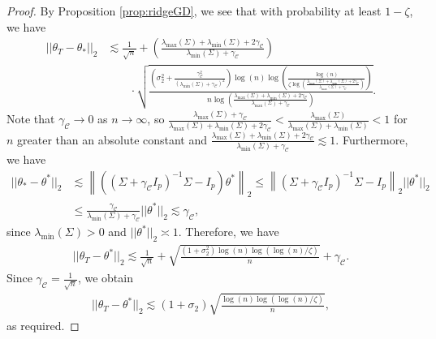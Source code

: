 \documentclass{article}
\begin{document}
\begin{proof}
By Proposition \ref{prop:ridgeGD}, we see that with probability at least $1 - \zeta$, we have
\begin{align*}
||\theta_T - \theta_{*}||_2 &\lesssim \frac{1}{\sqrt{n}} + \left(\frac{\lambda_{\max}(\Sigma) + \lambda_{\min}(\Sigma) + 2\gamma_{\mathcal{C}}}{\lambda_{\min}(\Sigma) + \gamma_{\mathcal{C}}}\right)\\
& \qquad \cdot \sqrt{\frac{\left(\sigma_2^2 + \frac{\gamma_{\mathcal{C}}^2}{(\lambda_{\min}(\Sigma) + \gamma_{\mathcal{C}})^2}\right)\log(n)\log\left(\frac{\log(n)}{\zeta\log\left(\frac{\lambda_{\max}(\Sigma) + \lambda_{\min}(\Sigma) + 2\gamma_{\mathcal{C}}}{\lambda_{\max}(\Sigma) + \gamma_{\mathcal{C}}}\right)}\right)}{n\log\left(\frac{\lambda_{\max}(\Sigma) + \lambda_{\min}(\Sigma) + 2\gamma_{\mathcal{C}}}{\lambda_{\max}(\Sigma) + \gamma_{\mathcal{C}}}\right)}}.
\end{align*}
Note that $\gamma_{\mathcal{C}} \rightarrow 0$ as $n \rightarrow \infty$, so $\frac{\lambda_{\max}(\Sigma) + \gamma_{\mathcal{C}}}{\lambda_{\max}(\Sigma) + \lambda_{\min}(\Sigma) + 2\gamma_{\mathcal{C}}} < \frac{\lambda_{\max}(\Sigma)}{\lambda_{\max}(\Sigma) + \lambda_{\min}(\Sigma)} < 1$ for $n$ greater than an absolute constant and $\frac{\lambda_{\max}(\Sigma) + \lambda_{\min}(\Sigma) + 2\gamma_{\mathcal{C}}}{\lambda_{\min}(\Sigma) + \gamma_{\mathcal{C}}} \lesssim 1$. Furthermore, we have
\begin{align*}
||\theta_{*} - \theta^*||_2 &\lesssim \left\|\left((\Sigma + \gamma_{\mathcal{C}}I_p)^{-1}\Sigma - I_p\right)\theta^*\right\|_2 \leq \left\|(\Sigma + \gamma_{\mathcal{C}}I_p)^{-1}\Sigma - I_p\right\|_2||\theta^*||_2\\
&\leq \frac{\gamma_{\mathcal{C}}}{\lambda_{\min}(\Sigma) + \gamma_{\mathcal{C}}}||\theta^*||_2 \lesssim \gamma_{\mathcal{C}},
\end{align*}
since $\lambda_{\min}(\Sigma) > 0$ and $||\theta^*||_2 \asymp 1$. Therefore, we have
\begin{align}
\label{eq:HT_RI_MIN>0}
||\theta_T - \theta^*||_2 \lesssim \frac{1}{\sqrt{n}} + \sqrt{\frac{(1 + \sigma_2^2)\log(n)\log(\log(n)/\zeta)}{n}} + \gamma_{\mathcal{C}}.
\end{align}
Since $\gamma_{\mathcal{C}} = \frac{1}{\sqrt{n}}$, we obtain
\begin{align*}
||\theta_T - \theta^*||_2 \lesssim (1 + \sigma_2)\sqrt{\frac{\log(n)\log(\log(n)/\zeta)}{n}},
\end{align*}
as required.
\end{proof}
\end{document}
